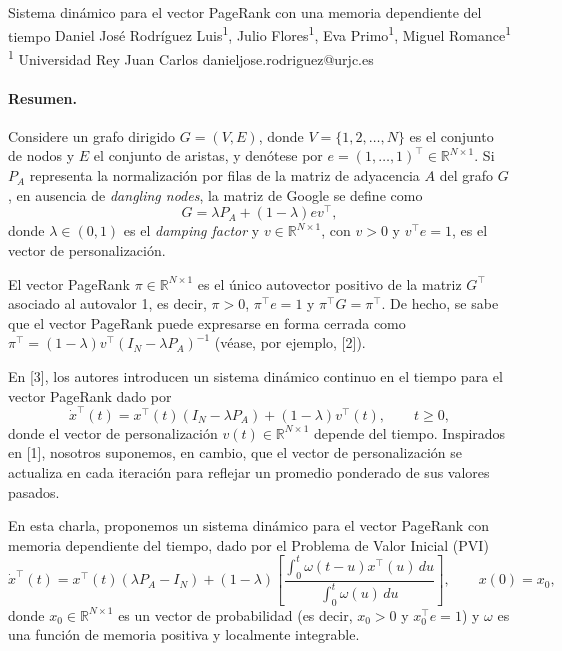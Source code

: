 \documentclass[11pt,a4paper]{article}
\begin{document}
\begin{sincabstract}
{Sistema dinámico para el vector PageRank con una memoria dependiente del tiempo}
{Daniel José Rodríguez Luis\textsuperscript{1}, Julio Flores\textsuperscript{1}, Eva Primo\textsuperscript{1}, Miguel Romance\textsuperscript{1}}
{\textsuperscript{1} Universidad Rey Juan Carlos}
{danieljose.rodriguez@urjc.es}

\paragraph{Resumen.}
Considere un grafo dirigido $G=(V,E)$, donde $V=\{1,2,\ldots,N\}$ es el conjunto de nodos y $E$ el conjunto de aristas, y denótese por $e=(1,\ldots,1)^\top\in\mathbb{R}^{N\times 1}$. Si $P_A$ representa la normalización por filas de la matriz de adyacencia $A$ del grafo $G$, en ausencia de \textit{dangling nodes}, la matriz de Google se define como
\begin{equation*}
G=\lambda P_A+(1-\lambda)ev^\top,
\end{equation*}
donde $\lambda\in(0,1)$ es el \textit{damping factor} y $v\in\mathbb{R}^{N\times 1}$, con $v>0$ y $v^\top e=1$, es el vector de personalización.

El vector PageRank $\pi\in\mathbb{R}^{N\times 1}$ es el único autovector positivo de la matriz $G^\top$ asociado al autovalor 1, es decir, $\pi>0$, $\pi^\top e=1$ y $\pi^\top G=\pi^\top$. De hecho, se sabe que el vector PageRank puede expresarse en forma cerrada como $\pi^\top=(1-\lambda)v^\top(I_N-\lambda P_A)^{-1}$ (véase, por ejemplo, [2]).

En [3], los autores introducen un sistema dinámico continuo en el tiempo para el vector PageRank dado por
\begin{equation*}
\dot{x}^{\top}(t)=x^{\top}(t)(I_N-\lambda P_A)+(1-\lambda)v^{\top}(t), \qquad t\geq 0,
\end{equation*}
donde el vector de personalización $v(t)\in\mathbb{R}^{N\times 1}$ depende del tiempo. Inspirados en [1], nosotros suponemos, en cambio, que el vector de personalización se actualiza en cada iteración para reflejar un promedio ponderado de sus valores pasados.

En esta charla, proponemos un sistema dinámico para el vector PageRank con memoria dependiente del tiempo, dado por el Problema de Valor Inicial (PVI)
\begin{equation*}
\dot{x}^{\top}(t)=x^{\top}(t)(\lambda P_A-I_N)+(1-\lambda)\left[\frac{\int_0^t \omega(t-u)x^{\top}(u)\,du}{\int_0^t \omega(u)\,du}\right],
\qquad x(0)=x_0,
\end{equation*}
donde $x_0\in\mathbb{R}^{N\times 1}$ es un vector de probabilidad (es decir, $x_0>0$ y $x_0^\top e=1$) y $\omega$ es una función de memoria positiva y localmente integrable.


\end{sincabstract}
\end{document}

